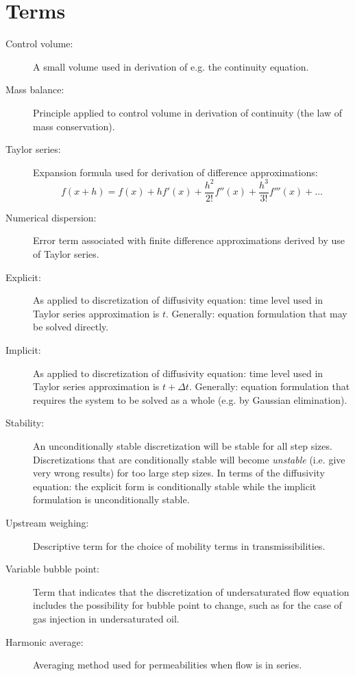 
\section{Terms} %
\label{sec:terms}

\begin{description}
  \item[Control volume:] A small volume used in derivation of e.g. the continuity equation.
  \item[Mass balance:] Principle applied to control volume in derivation of continuity (the law of mass conservation).
  \item[Taylor series:] Expansion formula used for derivation of difference approximations:
    \begin{equation}
      f(x+h) = f(x) + h f'(x) + \frac{h^2}{2!} f''(x) + \frac{h^3}{3!} f'''(x) + \dots
    \end{equation}
  \item[Numerical dispersion:] Error term associated with finite difference approximations derived by use of Taylor series.
  \item[Explicit:] As applied to discretization of diffusivity equation: time level used in Taylor series approximation is $t$. Generally: equation formulation that may be solved directly.
  \item[Implicit:] As applied to discretization of diffusivity equation: time level used in Taylor series approximation is $t+\Delta t$. Generally: equation formulation that requires the system to be solved as a whole (e.g. by Gaussian elimination).
  \item[Stability:] An unconditionally stable discretization will be stable for all step sizes. Discretizations that are conditionally stable will become \emph{unstable} (i.e. give very wrong results) for too large step sizes. In terms of the diffusivity equation: the explicit form is conditionally stable while the implicit formulation is unconditionally stable.
  \item[Upstream weighing:] Descriptive term for the choice of mobility terms in transmissibilities.
  \item[Variable bubble point:] Term that indicates that the discretization of undersaturated flow equation includes the possibility for bubble point to change, such as for the case of gas injection in undersaturated oil.
  \item[Harmonic average:] Averaging method used for permeabilities when flow is in series.

\end{description}
